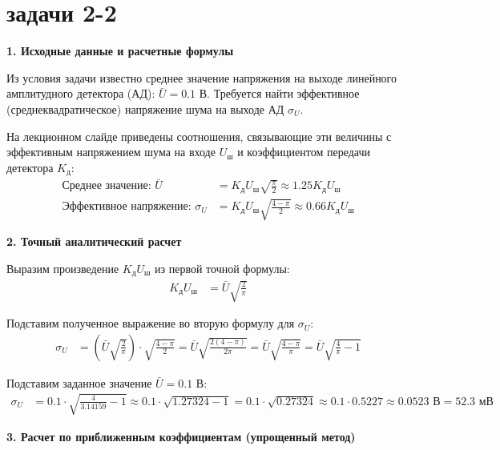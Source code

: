 \section{задачи 2-2}

\vspace{1em}
\textbf{1. Исходные данные и расчетные формулы}

Из условия задачи известно среднее значение напряжения на выходе линейного амплитудного детектора (АД): $\bar{U} = 0.1 \text{ В}$. Требуется найти эффективное (среднеквадратическое) напряжение шума на выходе АД $\sigma_U$.

На лекционном слайде приведены соотношения, связывающие эти величины с эффективным напряжением шума на входе $U_{\text{ш}}$ и коэффициентом передачи детектора $K_{\text{д}}$:
\begin{align*}
    \text{Среднее значение: } \bar{U} &= K_{\text{д}} U_{\text{ш}} \sqrt{\frac{\pi}{2}} \approx 1.25 K_{\text{д}} U_{\text{ш}} \\
    \text{Эффективное напряжение: } \sigma_U &= K_{\text{д}} U_{\text{ш}} \sqrt{\frac{4-\pi}{2}} \approx 0.66 K_{\text{д}} U_{\text{ш}}
\end{align*}

\vspace{1em}
\textbf{2. Точный аналитический расчет}

Выразим произведение $K_{\text{д}} U_{\text{ш}}$ из первой точной формулы:
\begin{align*}
    K_{\text{д}} U_{\text{ш}} &= \bar{U} \sqrt{\frac{2}{\pi}}
\end{align*}

Подставим полученное выражение во вторую формулу для $\sigma_U$:
\begin{align*}
    \sigma_U &= \left( \bar{U} \sqrt{\frac{2}{\pi}} \right) \cdot \sqrt{\frac{4-\pi}{2}} = \bar{U} \sqrt{\frac{2(4-\pi)}{2\pi}} = \bar{U} \sqrt{\frac{4-\pi}{\pi}} = \bar{U} \sqrt{\frac{4}{\pi} - 1}
\end{align*}

Подставим заданное значение $\bar{U} = 0.1 \text{ В}$:
\begin{align*}
    \sigma_U &= 0.1 \cdot \sqrt{\frac{4}{3.14159} - 1} \approx 0.1 \cdot \sqrt{1.27324 - 1} = 0.1 \cdot \sqrt{0.27324} \approx 0.1 \cdot 0.5227 \approx 0.0523 \text{ В} = 52.3 \text{ мВ}
\end{align*}

\vspace{1em}
\textbf{3. Расчет по приближенным коэффициентам (упрощенный метод)}

